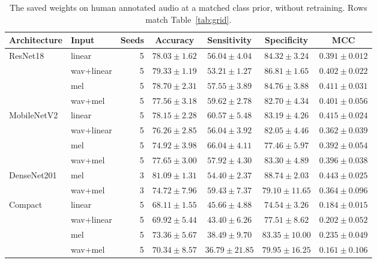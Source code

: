\begin{table}[tbp]
\caption{The saved weights on human annotated audio at a matched class prior, without retraining. Rows match Table~\ref{tab:grid}.}\label{tab:external}
\small
\begin{tabular}{@{}llrcccc@{}}
\toprule
Architecture & Input & Seeds & Accuracy & Sensitivity & Specificity & MCC \\
\midrule
ResNet18 & linear & 5 & $78.03 \pm 1.62$ & $56.04 \pm 4.04$ & $84.32 \pm 3.24$ & $0.391 \pm 0.012$ \\
 & wav+linear & 5 & $79.33 \pm 1.19$ & $53.21 \pm 1.27$ & $86.81 \pm 1.65$ & $0.402 \pm 0.022$ \\
 & mel & 5 & $78.70 \pm 2.31$ & $57.55 \pm 3.89$ & $84.76 \pm 3.88$ & $0.411 \pm 0.031$ \\
 & wav+mel & 5 & $77.56 \pm 3.18$ & $59.62 \pm 2.78$ & $82.70 \pm 4.34$ & $0.401 \pm 0.056$ \\
\addlinespace
MobileNetV2 & linear & 5 & $78.15 \pm 2.28$ & $60.57 \pm 5.48$ & $83.19 \pm 4.26$ & $0.415 \pm 0.024$ \\
 & wav+linear & 5 & $76.26 \pm 2.85$ & $56.04 \pm 3.92$ & $82.05 \pm 4.46$ & $0.362 \pm 0.039$ \\
 & mel & 5 & $74.92 \pm 3.98$ & $66.04 \pm 4.11$ & $77.46 \pm 5.97$ & $0.392 \pm 0.054$ \\
 & wav+mel & 5 & $77.65 \pm 3.00$ & $57.92 \pm 4.30$ & $83.30 \pm 4.89$ & $0.396 \pm 0.038$ \\
\addlinespace
DenseNet201 & mel & 3 & $81.09 \pm 1.31$ & $54.40 \pm 2.37$ & $88.74 \pm 2.03$ & $0.443 \pm 0.025$ \\
 & wav+mel & 3 & $74.72 \pm 7.96$ & $59.43 \pm 7.37$ & $79.10 \pm 11.65$ & $0.364 \pm 0.096$ \\
\addlinespace
Compact & linear & 5 & $68.11 \pm 1.55$ & $45.66 \pm 4.88$ & $74.54 \pm 3.26$ & $0.184 \pm 0.015$ \\
 & wav+linear & 5 & $69.92 \pm 5.44$ & $43.40 \pm 6.26$ & $77.51 \pm 8.62$ & $0.202 \pm 0.052$ \\
 & mel & 5 & $73.36 \pm 5.67$ & $38.49 \pm 9.70$ & $83.35 \pm 10.00$ & $0.235 \pm 0.049$ \\
 & wav+mel & 5 & $70.34 \pm 8.57$ & $36.79 \pm 21.85$ & $79.95 \pm 16.25$ & $0.161 \pm 0.106$ \\
\bottomrule
\end{tabular}
\end{table}


